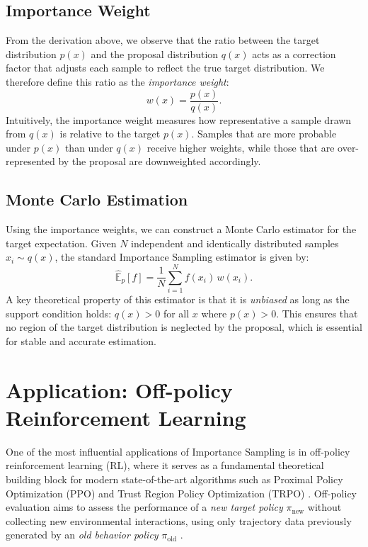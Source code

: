 \documentclass[conference,compsoc]{IEEEtran}
\begin{document}
\subsection{Importance Weight}
From the derivation above, we observe that the ratio between the target distribution \(p(x)\) and the proposal distribution \(q(x)\) acts as a correction factor that adjusts each sample to reflect the true target distribution. We therefore define this ratio as the \emph{importance weight}:
\[
w(x) = \frac{p(x)}{q(x)}.
\]
Intuitively, the importance weight measures how representative a sample drawn from \(q(x)\) is relative to the target \(p(x)\). Samples that are more probable under \(p(x)\) than under \(q(x)\) receive higher weights, while those that are over-represented by the proposal are downweighted accordingly.

\subsection{Monte Carlo Estimation}
Using the importance weights, we can construct a Monte Carlo estimator for the target expectation. Given \(N\) independent and identically distributed samples \(x_i \sim q(x)\), the standard Importance Sampling estimator is given by:
\[
\hat{\mathbb{E}}_{p}[f] = \frac{1}{N}\sum_{i=1}^N f(x_i)\,w(x_i).
\]
A key theoretical property of this estimator is that it is \emph{unbiased} as long as the support condition holds: \(q(x) > 0\) for all \(x\) where \(p(x) > 0\). This ensures that no region of the target distribution is neglected by the proposal, which is essential for stable and accurate estimation.

\section{Application: Off-policy Reinforcement Learning}
One of the most influential applications of Importance Sampling is in off-policy reinforcement learning (RL), where it serves as a fundamental theoretical building block for modern state-of-the-art algorithms such as Proximal Policy Optimization (PPO) and Trust Region Policy Optimization (TRPO) \cite{schulman2017proximal, schulman2015trust}. Off-policy evaluation aims to assess the performance of a \emph{new target policy} \(\pi_{\text{new}}\) without collecting new environmental interactions, using only trajectory data previously generated by an \emph{old behavior policy} \(\pi_{\text{old}}\) \cite{sugiyama2015statistical,precup2000eligibility}.
\end{document}
